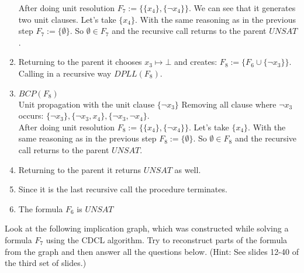 \documentclass[addpoints,12pt]{exam}
\begin{document}
\begin{questions}
\begin{enumerate}
    After doing unit resolution $F_7:= \{\{x_4\} , \{\neg x_4\}\}$. We can see that it generates two unit clauses. Let's take $\{x_4\}$.
    With the same reasoning as in the previous step $F_7:=\{\emptyset\}$.
    So $\emptyset \in F_7$ and the recursive call returns to the parent $UNSAT$.
    \item Returning to the parent it chooses $x_3\mapsto \bot$ and creates: $F_8:=\{F_6 \cup \{\neg x_3\}\}$. Calling in a recursive way $DPLL(F_8).$
    \item $BCP(F_8)$ \\
    Unit propagation with the unit clause $\{\neg x_3\}$
    Removing all clause where $\neg x_3$ occurs: $\{\neg x_3\},\{\neg x_3 , x_4\},\{\neg x_3 , \neg x_4\}$.\\
    After doing unit resolution $F_8:= \{\{x_4\} , \{\neg x_4\}\}$. Let's take $\{x_4\}$.
    With the same reasoning as in the previous step $F_8:=\{\emptyset\}$.
    So $\emptyset \in F_8$ and the recursive call returns to the parent $UNSAT$.
    \item Returning to the parent it returns $UNSAT$ as well.
    \item Since it is the last recursive call the procedure terminates.
    \item The formula $F_6$ is $UNSAT$
\end{enumerate}
\newpage
\question[20]
\vspace*{5pt}

Look at the following implication graph, which was constructed while solving a formula $F_7$ using the CDCL algorithm.
Try to reconstruct parts of the formula from the graph and then answer all the questions below.
(Hint: See slides 12-40 of the third set of slides.)
\vspace*{10pt}


\end{questions}
\end{document}
